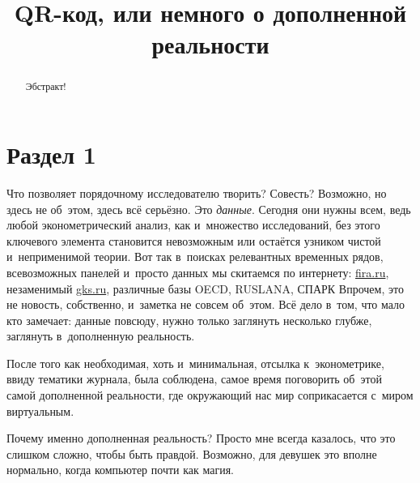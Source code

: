 \documentclass[final,pdftex]{../../template/epsilonj}
\begin{document}
	
	\begin{frontmatter}
		\title{QR-код, или немного о дополненной реальности}
		
		\begin{aug}
			\author{ }%
			
			
			\address{НИУ ВШЭ, Москва.}
		\end{aug}
		
		\begin{abstract}
			Эбстракт!
		\end{abstract}
		
		\begin{keyword}
		\end{keyword}
		
	\end{frontmatter}
	
	
	\section{Раздел 1}


Что позволяет порядочному исследователю творить? Совесть?  Возможно, но здесь не об~этом, здесь всё серьёзно. Это \textit{данные}. Сегодня они нужны всем, ведь любой эконометрический анализ, как и~множество исследований, без этого ключевого элемента становится невозможным или остаётся узником чистой и~неприменимой теории. Вот так в~поисках релевантных временных рядов, всевозможных панелей и~просто данных мы скитаемся по интернету: \href{http://www.fira.ru}{fira.ru}, незаменимый \href{http://www.gks.ru}{gks.ru}, различные базы OECD, RUSLANA, СПАРК\ldotst{} Впрочем, это не новость, собственно, и~заметка не совсем об~этом. Всё дело в~том, что мало кто замечает: данные повсюду, нужно только заглянуть несколько глубже, заглянуть в~дополненную реальность. 

После того как необходимая, хоть и~минимальная, отсылка к~эконометрике, ввиду тематики журнала, была соблюдена, самое время поговорить об~этой самой дополненной реальности, где окружающий нас мир соприкасается с~миром виртуальным.

Почему именно дополненная реальность? Просто мне всегда казалось, что это слишком сложно, чтобы быть правдой. Возможно, для девушек это вполне нормально, когда компьютер почти как магия.
\end{document}
